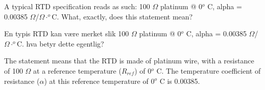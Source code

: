 


A typical RTD specification reads as such: 100 $\Omega$ platinum @ 0$^{o}$ C, alpha = 0.00385 $\Omega$/$\Omega \cdot ^{o}$C.  What, exactly, does this statement mean?

En typis RTD kan v{\ae}re merket slik 100 $\Omega$ platinum @ 0$^{o}$ C, alpha = 0.00385 $\Omega$/$\Omega \cdot ^{o}$C.  hva betyr dette egentlig?








The statement means that the RTD is made of platinum wire, with a resistance of 100 $\Omega$ at a reference temperature ($R_{ref}$) of 0$^{o}$ C.  The temperature coefficient of resistance ($\alpha$) at this reference temperature of 0$^{o}$ C is 0.00385.











